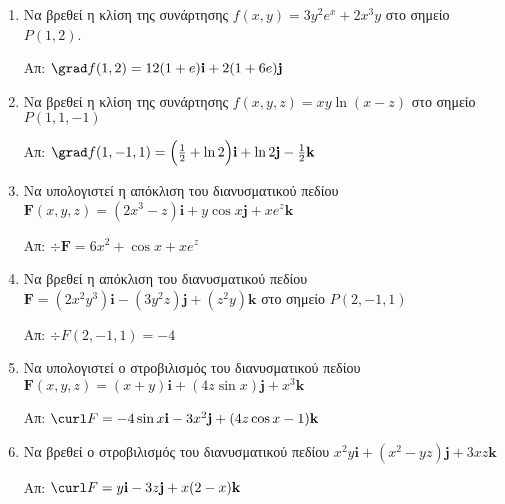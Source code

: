 


\pagestyle{askhseis}
\everymath{\displaystyle}
\renewcommand{\vec}{\mathbf}



\begin{center}
  \minibox{\large\bf \textcolor{Col1}{Ασκήσεις Κλίση, Απόκλιση, Στροβιλισμός}}
\end{center}

\vspace{\baselineskip}

\begin{enumerate}
\item Να βρεθεί η κλίση της συνάρτησης $ f(x,y)=3y^2e^x+2x^3y $ στο σημείο $P(1,2)$.

\hfill Απ: $\grad f(1,2)=12(1+e)\vec{i}+2(1+6e)\vec{j}$

\item Να βρεθεί η κλίση της συνάρτησης $ f(x,y, z)=xy\ln(x-z) $ στο σημείο $P(1,1,-1)$

\hfill Απ: $\grad f(1,-1,1)=\Bigl(\frac{1}{2}+\ln2\Bigr)\vec{i}+\ln 2\vec{j}- 
\frac{1}{2}\vec{k} $


\item Να υπολογιστεί η απόκλιση του διανυσματικού πεδίου
$ \boldsymbol{F}(x,y,z)=(2x^3-z)\vec{i}+y\cos x\vec{j}+xe^z\vec{k} $

\hfill Απ: $\div\boldsymbol{F}=6x^2+\cos x+xe^z$

\item Να βρεθεί η απόκλιση του διανυσματικού πεδίου 
  $ \boldsymbol{F}=(2x^2y^3)\vec{i}-(3y^2z)\vec{j}+(z^2y)\vec{k} $ στο σημείο $P(2,-1,1)$

\hfill Απ: $\div F(2,-1,1)=-4$

\item Να υπολογιστεί ο στροβιλισμός του διανυσματικού πεδίου
$ \boldsymbol{F}(x,y,z)=(x+y)\vec{i}+(4z\sin x)\vec{j}+x^3\vec{k} $

\hfill Απ: $\curl F=-4\sin x\vec{i}-3x^2\vec{j}+(4z\cos x-1)\vec{k}$

\item Να βρεθεί ο στροβιλισμός του διανυσματικού πεδίου 
$ x^2y\vec{i}+(x^2-yz)\vec{j}+3xz\vec{k} $

\hfill Απ: $\curl F=y\vec{i}-3z\vec{j}+x(2-x)\vec{k}$
\end{enumerate}




